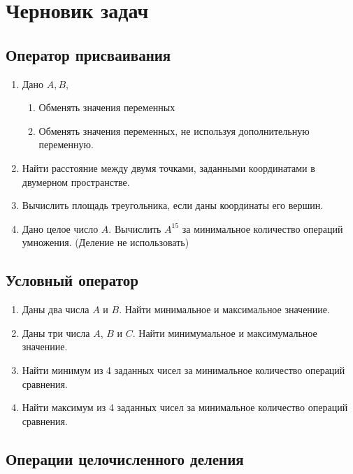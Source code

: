\newpage
\section{Черновик задач}

\subsection{Оператор присваивания}

\begin{enumerate}
  \item Дано $A, B$,
    \begin{enumerate}
      \item Обменять значения переменных
      \item Обменять значения переменных, не используя дополнительную переменную.
    \end{enumerate}

  \item Найти расстояние между двумя точками, заданными координатами в двумерном пространстве.

  \item Вычислить площадь треугольника, если даны координаты его вершин.

  \item Дано целое число $A$. Вычислить $A^{15}$ за минимальное количество операций умножения. (Деление не использовать)
\end{enumerate}

\subsection{Условный оператор}

\begin{enumerate}
  \item Даны два числа $A$ и $B$. Найти минимальное и максимальное значениие.

  \item Даны три числа $A$, $B$ и $C$. Найти минимумальное и максимумальное значениие.

  \item Найти минимум из 4 заданных чисел за минимальное количество операций сравнения.

  \item Найти максимум из 4 заданных чисел за минимальное количество операций сравнения.
\end{enumerate}

\subsection{Операции целочисленного деления}


